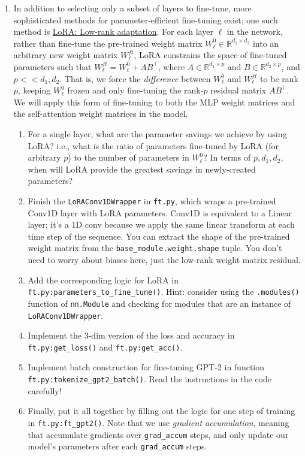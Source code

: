 \documentclass[12pt]{article}
\begin{document}
\begin{enumerate}
    \item In addition to selecting only a subset of layers to fine-tune, more sophisticated methods for parameter-efficient fine-tuning exist; one such method is \href{https://arxiv.org/pdf/2106.09685.pdf}{LoRA: Low-rank adaptation}. For each layer $\ell$ in the network, rather than fine-tune the pre-trained weight matrix $W_\ell^0 \in \mathbb{R}^{d_1\times d_2}$ into an arbitrary new weight matrix $W_\ell^{ft}$, LoRA constrains the space of fine-tuned parameters such that $W_\ell^{ft} = W_\ell^0 + AB^\top$, where $A \in \mathbb{R}^{d_1\times p}$ and $B \in \mathbb{R}^{d_2\times p}$, and $p << d_1,d_2$. That is, we force the \textit{difference} between $W_\ell^0$ and $W_\ell^{ft}$ to be rank $p$, keeping $W_\ell^0$ frozen and only fine-tuning the rank-$p$ residual matrix $AB^\top$. We will apply this form of fine-tuning to both the MLP weight matrices and the self-attention weight matrices in the model.
    \begin{enumerate}
        \item For a single layer, what are the parameter savings we achieve by using LoRA? i.e., what is the ratio of parameters fine-tuned by LoRA (for arbitrary $p$) to the number of parameters in $W_\ell^0$? In terms of $p,d_1,d_2$, when will LoRA provide the greatest savings in newly-created parameters?
        \item Finish the \texttt{LoRAConv1DWrapper} in \texttt{ft.py}, which wraps a pre-trained Conv1D layer with LoRA parameters. Conv1D is equivalent to a Linear layer; it's a 1D conv because we apply the same linear transform at each time step of the sequence. You can extract the shape of the pre-trained weight matrix from the \texttt{base\_module.weight.shape} tuple. You don't need to worry about biases here, just the low-rank weight matrix residual.
        
        \item Add the corresponding logic for LoRA in \texttt{ft.py:parameters\_to\_fine\_tune()}. Hint: consider using the \texttt{.modules()} function of \texttt{nn.Module} and checking for modules that are an instance of \texttt{LoRAConv1DWrapper}.
        \item Implement the 3-dim version of the loss and accuracy in \texttt{ft.py:get\_loss()} and \texttt{ft.py:get\_acc()}.
        \item Implement batch construction for fine-tuning GPT-2 in function \texttt{ft.py:\allowbreak tokenize\_\allowbreak gpt2\_batch()}. Read the instructions in the code carefully!
        \item Finally, put it all together by filling out the logic for one step of training in \texttt{ft.py:ft\_gpt2()}. Note that we use \textit{gradient accumulation}, meaning that accumulate gradients over \texttt{grad\_accum} steps, and only update our model's parameters after each \texttt{grad\_accum} steps.
    \end{enumerate}
    

\end{enumerate}
\end{document}
